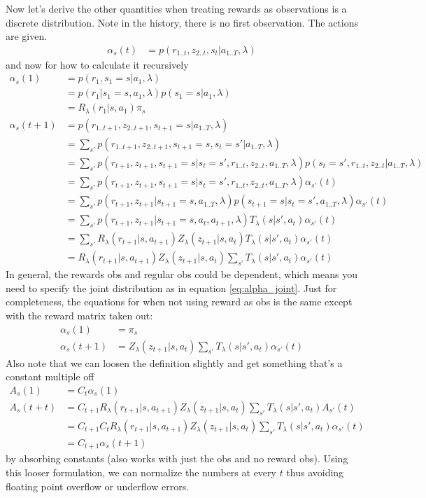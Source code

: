 \documentclass[10pt,english]{article}
\begin{document}
Now let's derive the other quantities when treating rewards as observations is a discrete distribution. Note in the history, there is no first observation. The actions are given.
\begin{align}
\alpha_s(t) &= p(r_{1..t},z_{2..t},s_t|a_{1..T},\lambda)
\end{align}
and now for how to calculate it recursively
\begin{align}
\alpha_s(1) &= p(r_1,s_1=s|a_1,\lambda) \\
&= p(r_1|s_1=s,a_1,\lambda)p(s_1=s|a_1,\lambda) \\
&= R_\lambda(r_1|s,a_1)\pi_s \\
\alpha_s(t+1) &= p(r_{1..t+1},z_{2..t+1},s_{t+1}=s|a_{1..T},\lambda) \\
&= \sum_{s'} p(r_{1..t+1},z_{2..t+1},s_{t+1}=s,s_t=s'|a_{1..T},\lambda) \\
&= \sum_{s'} p(r_{t+1},z_{t+1},s_{t+1}=s|s_t=s',r_{1..t},z_{2..t},a_{1..T},\lambda) p(s_t=s',r_{1..t},z_{2..t}|a_{1..T},\lambda) \\
&= \sum_{s'} p(r_{t+1},z_{t+1},s_{t+1}=s|s_t=s',r_{1..t},z_{2..t},a_{1..T},\lambda) \alpha_{s'}(t) \\
&= \sum_{s'} p(r_{t+1},z_{t+1}|s_{t+1}=s,a_{1..T},\lambda) p(s_{t+1}=s|s_t=s',a_{1..T},\lambda) \alpha_{s'}(t) \\
&= \sum_{s'} p(r_{t+1},z_{t+1}|s_{t+1}=s,a_{t},a_{t+1},\lambda) T_\lambda(s|s',a_t) \alpha_{s'}(t) \label{eq:alpha_joint} \\
&= \sum_{s'} R_\lambda(r_{t+1}|s,a_{t+1}) Z_\lambda(z_{t+1}|s,a_t) T_\lambda(s|s',a_t) \alpha_{s'}(t) \\
&= R_\lambda(r_{t+1}|s,a_{t+1}) Z_\lambda(z_{t+1}|s,a_t) \sum_{s'} T_\lambda(s|s',a_t) \alpha_{s'}(t)
\end{align}
In general, the rewards obs and regular obs could be dependent, which means you need to specify the joint distribution as in equation \ref{eq:alpha_joint}. Just for completeness, the equations for when not using reward as obs is the same except with the reward matrix taken out:
\begin{align}
\alpha_s(1) &= \pi_s \\
\alpha_s(t+1) &= Z_\lambda(z_{t+1}|s,a_t) \sum_{s'} T_\lambda(s|s',a_t) \alpha_{s'}(t)
\end{align}
Also note that we can loosen the definition slightly and get something that's a constant multiple off
\begin{align}
A_s(1) &= C_t \alpha_s(1) \\
A_s(t+t) &= C_{t+1} R_\lambda(r_{t+1}|s,a_{t+1}) Z_\lambda(z_{t+1}|s,a_t) \sum_{s'} T_\lambda(s|s',a_t) A_{s'}(t) \\
&= C_{t+1} C_t R_\lambda(r_{t+1}|s,a_{t+1}) Z_\lambda(z_{t+1}|s,a_t) \sum_{s'} T_\lambda(s|s',a_t) \alpha_{s'}(t) \\
&= C_{t+1} \alpha_s(t+1)
\end{align}
by absorbing constants (also works with just the obs and no reward obs). Using this looser formulation, we can normalize the numbers at every $t$ thus avoiding floating point overflow or underflow errors.
\end{document}
